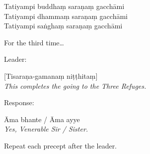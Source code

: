 Tatiyampi buddhaṃ saraṇaṃ gacchāmi\\
Tatiyampi dhammaṃ saraṇaṃ gacchāmi\\
Tatiyampi saṅghaṃ saraṇaṃ gacchāmi

\begin{english}
  For the third time\ldots
\end{english}

\begin{instruction}
  Leader:
\end{instruction}

[Tisaraṇa-gamanaṃ niṭṭhitaṃ]\\
\emph{This completes the going to the Three Refuges.}

\begin{instruction}
  Response:
\end{instruction}

Āma bhante / Āma ayye\\
\emph{Yes, Venerable Sir / Sister.}

\begin{instruction}
  Repeat each precept after the leader.
\end{instruction}

\ifhandbookedition
\enlargethispage{-\baselineskip}
\fi

